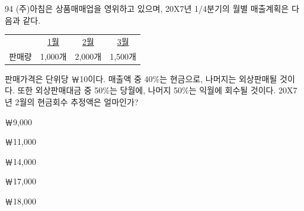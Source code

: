 \begin{question}{94}
(주)아침은 상품매매업을 영위하고 있으며, 20X7년 1/4분기의 월별 매출계획은 다음과 같다.

{\small\centering
\begin{tabular}{lccc}
\hline
 & \uline{1월} & \uline{2월} & \uline{3월} \\
판매량 & 1,000개 & 2,000개 & 1,500개 \\
\hline
\end{tabular}
\par}

판매가격은 단위당 ￦10이다. 매출액 중 40\%는 현금으로, 나머지는 외상판매될 것이다. 또한 외상판매대금 중 50\%는 당월에, 나머지 50\%는 익월에 회수될 것이다. 20X7년 2월의 현금회수 추정액은 얼마인가? \par
\begin{choices}
  \item ￦9,000
  \item ￦11,000
  \item ￦14,000
  \item ￦17,000
  \item ￦18,000
\end{choices}
\end{question}
